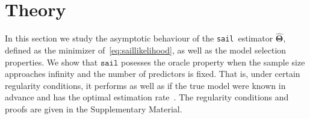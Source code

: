 \documentclass[12pt,letter]{article}\usepackage[]{graphicx}\usepackage[]{color}
\makeatletter
\newcommand{\sail}{\texttt{sail}}
\newcommand{\bTheta}{\boldsymbol{\Theta}}
\newcommand{\btheta}{\boldsymbol{\theta}}
\newcommand{\bPsi}{\boldsymbol{\Psi}}
\DeclareMathOperator*{\argmin}{arg\,min}
\DeclarePairedDelimiter\abs{\lvert}{\rvert}%
\DeclarePairedDelimiter\norm{\lVert}{\rVert}%
\let\oldabs\abs
\def\abs{\@ifstar{\oldabs}{\oldabs*}}
\let\oldnorm\norm
\def\norm{\@ifstar{\oldnorm}{\oldnorm*}}
\makeatother
\begin{document}

\section{Theory} \label{sec:theory}


In this section we study the asymptotic behaviour of the \sail ~estimator $\widehat{\bTheta}$, defined as the minimizer of~\eqref{eq:saillikelihood}, as well as the model selection properties. We show that $\texttt{{sail}}$ posesses the oracle property when the sample size approaches infinity and the number of predictors is fixed. That is, under certain regularity conditions, it performs as well as if the true model were known in advance and has the optimal estimation rate~\citep{zou2006adaptive}. The regularity conditions and proofs are given in the Supplementary Material. 

\end{document}
